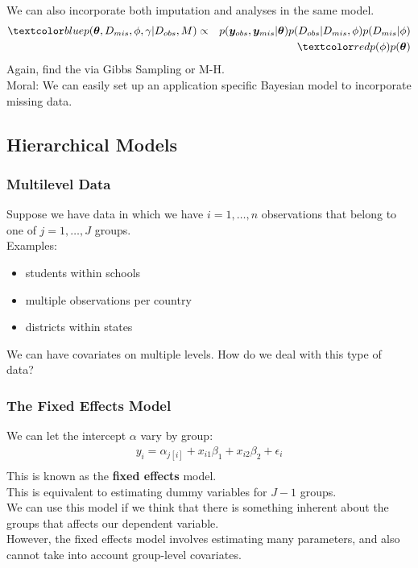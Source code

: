 \documentclass{beamer}
\begin{document}
\begin{frame}
We can also incorporate both imputation and analyses in the same model.
\begin{eqnarray*}
\blue{p(\bm{\theta}, D_{mis}, \phi, \gamma | D_{obs}, M)} &\propto&
p(\bm{y}_{obs}, \bm{y}_{mis} | \bm{\theta}) p(D_{obs}| D_{mis}
, \phi)p(D_{mis}|\phi) \\
&\phantom{\propto}&  \red{p(\phi) p(\bm{\theta})}\\
\end{eqnarray*}
\pause
Again, find the  via Gibbs Sampling or M-H. \\
\bigskip
\pause
Moral: We can easily set up an application specific Bayesian model to
incorporate missing data.
\end{frame}

\subsection{Hierarchical Models}

\begin{frame}
\frametitle{Multilevel Data}
\pause
Suppose we have data in which we have $i = 1, \dots, n$ observations
that belong to one of $j = 1, \dots, J$ groups. \\
\pause
\bigskip
Examples:
\pause 
\begin{itemize}
\item students within schools
\pause
\item multiple observations per country
\pause
\item districts within states
\end{itemize}
\pause
\bigskip
We can have covariates on multiple levels.  \pause How do we deal with this
type of data?
\end{frame}

\begin{frame}
\frametitle{The Fixed Effects Model}
\pause
We can let the intercept $\alpha$ vary by group:
\pause
\begin{eqnarray*}
y_i = \alpha_{j[i]} + x_{i1} \beta_1 + x_{i2} \beta_2 + \epsilon_i\\
\end{eqnarray*}
\pause
\bigskip
This is known as the {\bf fixed effects} model.  \\
\pause
\bigskip
This is equivalent to estimating dummy variables for $J-1$ groups. \\
\pause
\bigskip
We can use this model if we think that there is something inherent about the
groups that affects our dependent variable. \\
\pause
\bigskip
However, the fixed effects model involves estimating many parameters,
and also cannot take into account group-level covariates.
\end{frame}
\end{document}
